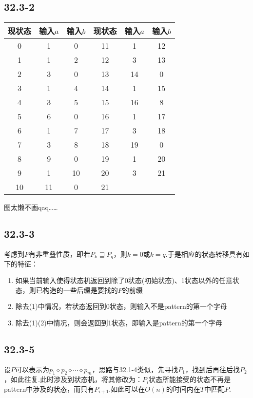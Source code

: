 \documentclass[twocolumn]{article}
\newenvironment{SChinese}{
	\CJKfamily{gbsn}
	\CJKtilde
	\CJKnospace}{}
\begin{document}
\begin{CJK}{UTF8}{}
\begin{SChinese}
			\subsection*{32.3-2}
				\begin{tabular}{|c|c|c|c|c|c|}
					\hline
					现状态  & 输入$a$ & 输入$b$ & 现状态 & 输入$a$ & 输入$b$\\\hline
					 0 & 1 & 0 & 11 & 1 & 12\\\hline
					 1 & 1 & 2 & 12 & 3 & 13\\\hline
					 2 & 3 & 0 & 13 & 14 & 0\\\hline
					 3 & 1 & 4 & 14 & 1 & 15\\\hline
					 4 & 3 & 5 & 15 & 16 & 8\\\hline
					 5 & 6 & 0 & 16 & 1 & 17\\\hline
					 6 & 1 & 7 & 17 & 3 & 18\\\hline
					 7 & 3 & 8 & 18 & 19 & 0\\\hline
					 8 & 9 & 0 & 19 & 1 & 20\\\hline
					 9 & 1 & 10 & 20 & 3 & 21\\\hline
					 10 & 11 & 0 & 21 & & \\\hline
				\end{tabular}
				图太懒不画qaq……
			\subsection*{32.3-3}
			\indent
			
				考虑到$P$有非重叠性质，即若$P_k\sqsupseteq P_q$，则$k=0$或$k=q$.于是相应的状态转移具有如下的特征：\\
				\begin{enumerate}[(1)]
					\item 如果当前输入使得状态机返回到除了0状态(初始状态)、1状态以外的任意状态，则已构造的一些后缀是要找的$P$的前缀\\
					\item 除去(1)中情况，若状态返回到0状态，则输入不是pattern的第一个字母\\
					\item 除去(1)(2)中情况，则会返回到1状态，即输入是pattern的第一个字母
				\end{enumerate}
			\subsection*{32.3-5}
			\indent
			
				设$P$可以表示为$p_1\diamond p_2\diamond\cdots\diamond p_m$，思路与32.1-4类似，先寻找$P_1$，找到后再往后找$P_2$，如此往复.此时涉及到状态机，将其修改为：$P_i$状态所能接受的状态不再是pattern中涉及的状态，而只有$P_{i+1}$.如此可以在$O(n)$的时间内在$T$中匹配$P$.
		\end{SChinese}
	\end{CJK}
\end{document}

